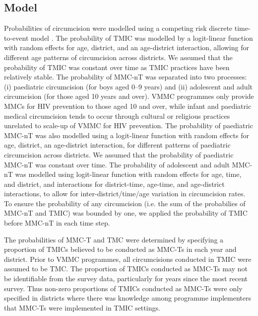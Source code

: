 \documentclass{article}
\begin{document}

\subsection*{Model}
\label{sec::model}


Probabilities of circumcision were modelled using a competing risk discrete time-to-event model \autocite{putter2006tutorial}. The probability of TMIC was modelled by a logit-linear function with random effects for age, district, and an age-district interaction, allowing for different age patterns of circumcision across districts. We assumed that the probability of TMIC was constant over time as TMIC practices have been relatively stable. The probability of MMC-nT was separated into two processes: (i) paediatric circumcision (for boys aged 0--9 years) and (ii) adolescent and adult circumcision (for those aged 10 years and over). VMMC programmes only provide MMCs for HIV prevention to those aged 10 and over, while infant and paediatric medical circumcision tends to occur through cultural or religious practices unrelated to scale-up of VMMC for HIV prevention. The probability of paediatric MMC-nT was also modelled using a logit-linear function with random effects for age, district, an age-district interaction, for different patterns of paediatric circumcision across districts. We assumed that the probability of paediatric MMC-nT was constant over time. The probability of adolescent and adult MMC-nT was modelled using logit-linear function with random effects for age, time, and district, and interactions for district-time, age-time, and age-district interactions, to allow for inter-district/time/age variation in circumcision rates. To ensure the probability of any circumcision (i.e. the sum of the probabilies of MMC-nT and TMIC) was bounded by one, we applied the probability of TMIC before MMC-nT in each time step. 

The probabilities of MMC-T and TMC were determined by specifying a proportion of TMICs believed to be conducted as MMC-Ts in each year and district. Prior to VMMC programmes, all circumcisions conducted in TMIC were assumed to be TMC. The proportion of TMICs conducted as MMC-Ts may not be identifiable from the survey data, particularly for years since the most recent survey. Thus non-zero proportions of TMICs conducted as MMC-Ts were only specified in districts where there was knowledge among programme implementers that MMC-Ts were implemented in TMIC settings. 
\end{document}
